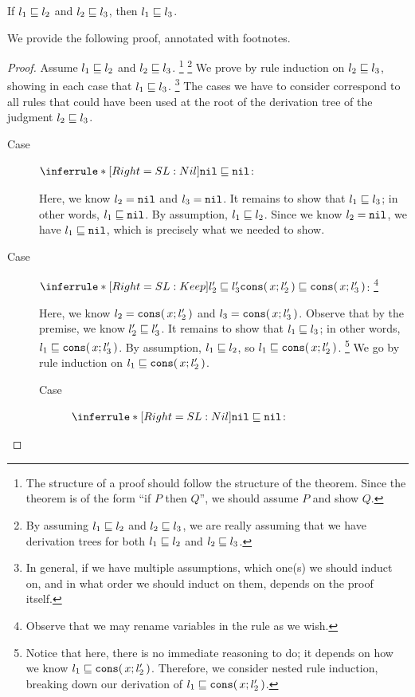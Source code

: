 \documentclass[11pt]{article}
\begin{document}
\begin{theorem}\label{thm:sublist-trans}
  If ${l_1} \sqsubseteq {l_2}$ and ${l_2} \sqsubseteq {l_3}$, then ${l_1} \sqsubseteq {l_3}$.
\end{theorem}
We provide the following proof, annotated with footnotes.
\begin{proof}
  Assume ${l_1} \sqsubseteq {l_2}$ and ${l_2} \sqsubseteq {l_3}$.%
  \footnote{The structure of a proof should follow the structure of the theorem. Since the theorem is of the form ``if $P$ then $Q$'', we should assume $P$ and show $Q$.}%
  \footnote{By assuming ${l_1} \sqsubseteq {l_2}$ and ${l_2} \sqsubseteq {l_3}$, we are really assuming that we have derivation trees for both ${l_1} \sqsubseteq {l_2}$ and ${l_2} \sqsubseteq {l_3}$.}
  We prove by rule induction on ${l_2} \sqsubseteq {l_3}$, showing in each case that ${l_1} \sqsubseteq {l_3}$.%
  \footnote{In general, if we have multiple assumptions, which one(s) we should induct on, and in what order we should induct on them, depends on the proof itself.}
  The cases we have to consider correspond to all rules that could have been used at the root of the derivation tree
  of the judgment ${l_2} \sqsubseteq {l_3}$.

  \begin{description}
    \item[Case]
      $\Infer[SL:Nil]
        {\strut}
        {\IsSublist{\NilList}{\NilList}}$:

      Here, we know $l_2 = \mathtt{nil}$ and $l_3 = \mathtt{nil}$.
      It remains to show that ${l_1} \sqsubseteq {l_3}$; in other words, ${l_1} \sqsubseteq {\ensuremath{\mathtt{nil}}}$.
      By assumption, ${l_1} \sqsubseteq {l_2}$. Since we know $l_2 = \mathtt{nil}$, we have ${l_1} \sqsubseteq {\ensuremath{\mathtt{nil}}}$, which is precisely what we needed to show.

    \item[Case]
      $\Infer[SL:Keep]
        {\IsSublist{l_2'}{l_3'}}
        {\IsSublist{\ConsList{x}{l_2'}}{\ConsList{x}{l_3'}}}$:%
      \footnote{Observe that we may rename variables in the rule as we wish.}

      Here, we know $l_2 = {\mathtt{cons}}\mathtt{(}\,x; l_2'\,\mathtt{)}$ and $l_3 = {\mathtt{cons}}\mathtt{(}\,x; l_3'\,\mathtt{)}$.
      Observe that by the premise, we know ${l_2'} \sqsubseteq {l_3'}$.
      It remains to show that ${l_1} \sqsubseteq {l_3}$; in other words, ${l_1} \sqsubseteq {{\ensuremath{\mathtt{cons}}}\ensuremath{\mathtt{(}}\,x; l_3'\,\ensuremath{\mathtt{)}}}$.
      By assumption, ${l_1} \sqsubseteq {l_2}$, so ${l_1} \sqsubseteq {{\ensuremath{\mathtt{cons}}}\ensuremath{\mathtt{(}}\,x; l_2'\,\ensuremath{\mathtt{)}}}$.%
      \footnote{Notice that here, there is no immediate reasoning to do; it depends on how we know ${l_1} \sqsubseteq {{\ensuremath{\mathtt{cons}}}\ensuremath{\mathtt{(}}\,x; l_2'\,\ensuremath{\mathtt{)}}}$. Therefore, we consider nested rule induction, breaking down our derivation of ${l_1} \sqsubseteq {{\ensuremath{\mathtt{cons}}}\ensuremath{\mathtt{(}}\,x; l_2'\,\ensuremath{\mathtt{)}}}$.}
      We go by rule induction on ${l_1} \sqsubseteq {{\ensuremath{\mathtt{cons}}}\ensuremath{\mathtt{(}}\,x; l_2'\,\ensuremath{\mathtt{)}}}$.
      \begin{description}
        \item[Case]
          $\Infer[SL:Nil]
            {\strut}
            {\IsSublist{\NilList}{\NilList}}$:


\end{description}
\end{description}
\end{proof}
\end{document}
